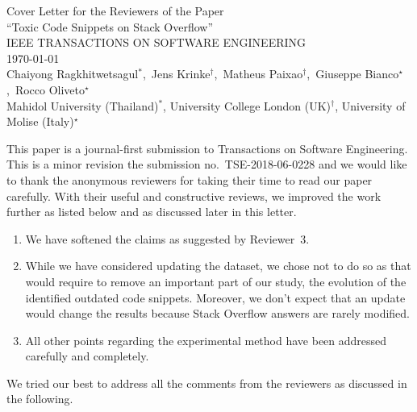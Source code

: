 \documentclass[a4paper,twoside,10pt]{reviewresponse}
\newcommand{\myAuthors}{Chaiyong Ragkhitwetsagul$^\ast$,~Jens Krinke$^\dagger$,~Matheus Paixao$^\dagger$,~Giuseppe Bianco$^\star$,~Rocco Oliveto$^\star$}
\newcommand{\myTitle}{Cover Letter for the Reviewers of the Paper \\ ``Toxic Code Snippets on Stack Overflow''}
\newcommand{\myJournal}{IEEE TRANSACTIONS ON SOFTWARE ENGINEERING}
\newcommand{\myDept}{Mahidol University (Thailand)$^\ast$, University College London (UK)$^\dagger$, University of Molise (Italy)$^\star$}
\begin{document}
\thispagestyle{plain}

\begin{center}
 {\LARGE\myTitle} \vspace{0.3cm} \\
 {\large\myJournal} \vspace{0.3cm} \\
 \today \vspace{0.3cm} \\
 \myAuthors \\
 \vspace{0.3cm} 
 \myDept \vspace{1cm}
\end{center}



This paper is a journal-first submission to Transactions on Software Engineering. This is a minor revision the submission no.~TSE-2018-06-0228 and we would like to thank the anonymous reviewers for taking their time to read our paper carefully. With their useful and constructive reviews, we improved the work further as listed below and as discussed later in this letter.

\begin{enumerate}
\item We have softened the claims as suggested by Reviewer~3.
\item While we have considered updating the dataset, we chose not to do so as that would require to remove an important part of our study, the evolution of the identified outdated code snippets. Moreover, we don't expect that an update would change the results because Stack Overflow answers are rarely modified.
\item All other points regarding the experimental method have been addressed carefully and completely.
\end{enumerate}

We tried our best to address all the comments from the reviewers as discussed in the following.
        

\end{document}
